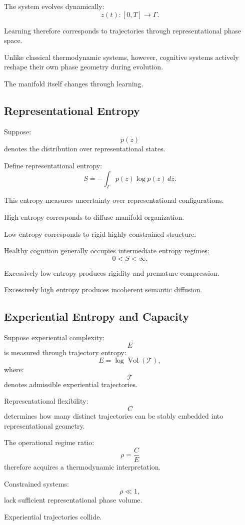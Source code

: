 \documentclass[12pt,a4paper]{article}
\begin{document}
The system evolves dynamically:
\[
z(t)
:
[0,T]
\rightarrow
\Gamma.
\]

Learning therefore corresponds to trajectories through representational phase space.

Unlike classical thermodynamic systems, however, cognitive systems actively reshape their own phase geometry during evolution.

The manifold itself changes through learning.

\subsection{Representational Entropy}

Suppose:
\[
p(z)
\]
denotes the distribution over representational states.

Define representational entropy:
\[
S
=
-
\int_\Gamma
p(z)\log p(z)
\,dz.
\]

This entropy measures uncertainty over representational configurations.

High entropy corresponds to diffuse manifold organization.

Low entropy corresponds to rigid highly constrained structure.

Healthy cognition generally occupies intermediate entropy regimes:
\[
0
<
S
<
\infty.
\]

Excessively low entropy produces rigidity and premature compression.

Excessively high entropy produces incoherent semantic diffusion.

\subsection{Experiential Entropy and Capacity}

Suppose experiential complexity:
\[
E
\]
is measured through trajectory entropy:
\[
E
=
\log
\operatorname{Vol}
(
\mathcal{T}
),
\]
where:
\[
\mathcal{T}
\]
denotes admissible experiential trajectories.

Representational flexibility:
\[
C
\]
determines how many distinct trajectories can be stably embedded into representational geometry.

The operational regime ratio:
\[
\rho
=
\frac{C}{E}
\]
therefore acquires a thermodynamic interpretation.

Constrained systems:
\[
\rho
\ll
1,
\]
lack sufficient representational phase volume.

Experiential trajectories collide.
\end{document}
